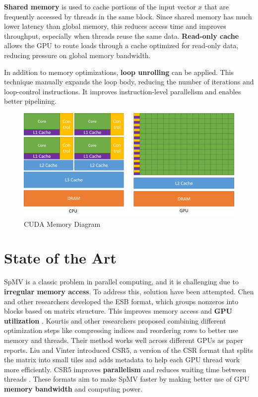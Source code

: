 \documentclass[conference]{IEEEtran}
\begin{document}
\textbf{Shared memory} is used to cache portions of the input vector $x$ that are frequently accessed by threads in the same block. Since shared memory has much lower latency than global memory, this reduces access time and improves throughput, especially when threads reuse the same data. \textbf{Read-only cache} allows the GPU to route loads through a cache optimized for read-only data, reducing pressure on global memory bandwidth.

In addition to memory optimizations, \textbf{loop unrolling} can be applied. This technique manually expands the loop body, reducing the number of iterations and loop-control instructions. It improves instruction-level parallelism and enables better pipelining.

\begin{figure}[ht]
    \centering
    \includegraphics[width=0.95\linewidth]{caches.png}
    \caption{CUDA Memory Diagram}
    \label{fig:spvmexample}
\end{figure}


\section{State of the Art}

SpMV is a classic problem in parallel computing, and it is challenging due to \textbf{irregular memory access}. To address this, solution have been attempted. Chen and other researchers developed the ESB format, which groups nonzeros into blocks based on matrix structure. This improves memory access and \textbf{GPU utilization} \cite{chen2009esb}. Kourtis and other researchers proposed combining different optimization steps like compressing indices and reordering rows to better use memory and threads. Their method works well across different GPUs as paper \cite{kourtis2008csrp} reports. Liu and Vinter introduced CSR5, a version of the CSR format that splits the matrix into small tiles and adds metadata to help each GPU thread work more efficiently. CSR5 improves \textbf{parallelism} and reduces waiting time between threads \cite{liu2015csr5}. These formats aim to make SpMV faster by making better use of GPU \textbf{memory bandwidth} and computing power.
\end{document}
